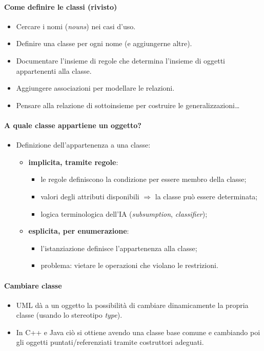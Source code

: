 \documentclass[a4paper,12pt]{article}
\begin{document}
\paragraph{Come definire le classi (rivisto)}
\begin{itemize}
  \item Cercare i nomi (\emph{nouns}) nei casi d'uso.
  \item Definire una classe per ogni nome (e aggiungerne altre).
  \item Documentare l'insieme di regole che determina l'insieme di oggetti appartenenti
        alla classe.
  \item Aggiungere associazioni per modellare le relazioni.
  \item Pensare alla relazione di sottoinsieme per costruire le generalizzazioni\dots
\end{itemize}
\paragraph{A quale classe appartiene un oggetto?}
\begin{itemize}
  \item Definizione dell'appartenenza a una classe:
  \begin{itemize}
    \item \textbf{implicita, tramite regole}:
    \begin{itemize}
      \item le regole definiscono la condizione per essere membro della classe;
      \item valori degli attributi disponibili $\Rightarrow$ la classe può essere
            determinata;
      \item logica terminologica dell'IA (\emph{subsumption}, \emph{classifier});
    \end{itemize}
    \item \textbf{esplicita, per enumerazione}:
    \begin{itemize}
      \item l'istanziazione definisce l'appartenenza alla classe;
      \item problema: vietare le operazioni che violano le restrizioni.
    \end{itemize}
  \end{itemize}
\end{itemize}
\paragraph{Cambiare classe}
\begin{itemize}
  \item UML dà a un oggetto la possibilità di cambiare dinamicamente la propria classe
        (usando lo stereotipo \emph{type}).
  \item In C++ e Java ciò si ottiene avendo una classe base comune e cambiando poi gli
        oggetti puntati/referenziati tramite costruttori adeguati.
\end{itemize}
\end{document}
